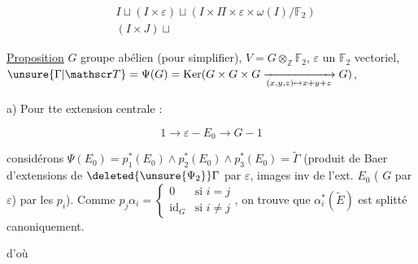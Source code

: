 \[
\begin{aligned}
&I\sqcup(I\times\varepsilon)\sqcup(I\times\Pi\times\varepsilon\times\omega(I)/\mathbb F_2)\\
&(I\times J)\sqcup
\end{aligned}
\]


\uline{Proposition} $G$ groupe abélien (pour simplifier), $V=G\otimes_{\mathbb Z}\mathbb F_2$, $\varepsilon$ un $\mathbb F_2$ vectoriel, $\unsure{\Gamma|\mathscr T}=\Psi(G)=\operatorname{Ker}(G\times G\times G\xrightarrow[(x,y,z)\mapsto x+y+z]{}G)$,


a) Pour tte extension centrale  :

\[
1\longrightarrow\varepsilon\mathbin{-} E_0\longrightarrow G\mathbin{-}1
\]

considérons $\Psi(E_0)=p_1^*(E_0)\wedge p_2^*(E_0)\wedge p_3^*(E_0)=\widetilde\Gamma$ (produit de Baer d'extensions de $\deleted{\unsure{\Psi_2}}\Gamma$ par $\varepsilon$, images inv de l'ext. $E_0$ ( $G$ par $\varepsilon$) par les $p_i$). Comme $p_j\alpha_i=\left\{\begin{array}{ll}0&\text{si }i=j\\ \mathrm{id}_G&\text{si }i\ne j\end{array}\right.$, on trouve que $\alpha_i^*(\widetilde E)$ est splitté canoniquement.

d'où


